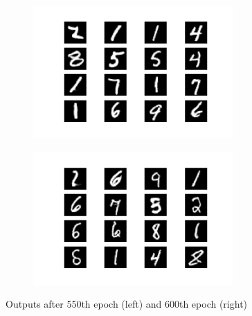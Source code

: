 \documentclass{article}
\begin{document}
\begin{appendices}
\begin{figure}[H]
\centering
\begin{subfigure}{.5\textwidth}
  \centering
  \includegraphics[width=3in]{csci-8110/hw-4/images/generated_plot_e550.png}
  \label{fig:ep20}
\end{subfigure}%
\begin{subfigure}{.5\textwidth}
  \centering
  \includegraphics[width=3in]{csci-8110/hw-4/images/generated_plot_e600.png}
  \label{fig:ep100_2}
\end{subfigure}
\caption{Outputs after 550th epoch (left) and 600th epoch (right)}
\label{fig:ep20-100}
\end{figure}


\end{appendices}
\end{document}
